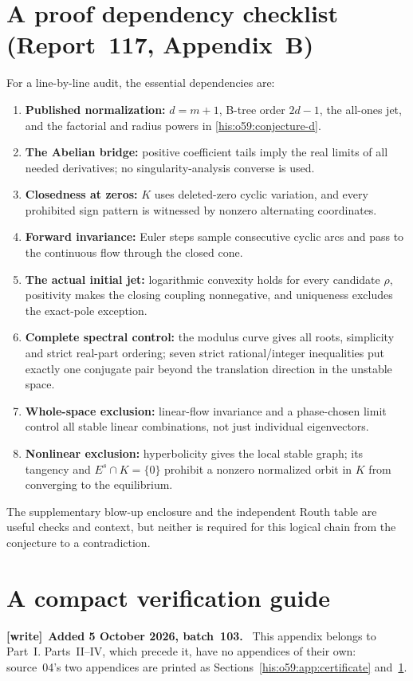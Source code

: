 \documentclass[11pt]{article}
\theoremstyle{remark}\newtheorem{remark}[theorem]{Remark}
\numberwithin{equation}{section}
\newenvironment{writenote}[1][]{\par\smallskip\begingroup\small
 \noindent\textbf{[write]}\if\relax\detokenize{#1}\relax\else~\textbf{#1.}\fi\ }%
 {\par\endgroup\smallskip}
\begin{document}
\section{A proof dependency checklist (Report~117, Appendix~B)}\label{his:o59:sec:checklist}
For a line-by-line audit, the essential dependencies are:
\begin{enumerate}[label=\arabic*.]
\item \textbf{Published normalization:}
$d=m+1$, B-tree order $2d-1$, the all-ones jet, and the factorial and
radius powers in \eqref{his:o59:conjecture-d}.
\item \textbf{The Abelian bridge:}
positive coefficient tails imply the real limits of all needed
derivatives; no singularity-analysis converse is used.
\item \textbf{Closedness at zeros:}
$K$ uses deleted-zero cyclic variation, and every prohibited sign
pattern is witnessed by nonzero alternating coordinates.
\item \textbf{Forward invariance:}
Euler steps sample consecutive cyclic arcs and pass to the continuous
flow through the closed cone.
\item \textbf{The actual initial jet:}
logarithmic convexity holds for every candidate $\rho$, positivity
makes the closing coupling nonnegative, and uniqueness excludes the
exact-pole exception.
\item \textbf{Complete spectral control:}
the modulus curve gives all roots, simplicity and strict real-part
ordering; seven strict rational/integer inequalities put exactly one
conjugate pair beyond the translation direction in the unstable space.
\item \textbf{Whole-space exclusion:}
linear-flow invariance and a phase-chosen limit control all stable
linear combinations, not just individual eigenvectors.
\item \textbf{Nonlinear exclusion:}
hyperbolicity gives the local stable graph; its tangency and
$E^s\cap K=\{0\}$ prohibit a nonzero normalized orbit in $K$ from
converging to the equilibrium.
\end{enumerate}
The supplementary blow-up enclosure and the independent Routh table
are useful checks and context, but neither is required for this
logical chain from the conjecture to a contradiction.

\clearpage
{}
\appendix
\section{A compact verification guide}\label{his:sec:guide}
\begin{writenote}[Added 5 October 2026, batch~103]
This appendix belongs to Part~I. Parts~II--IV, which precede it, have no appendices of their own: source~04's two appendices are printed as Sections~\ref{his:o59:app:certificate} and~\ref{his:o59:sec:checklist}.
\end{writenote}
\end{document}
